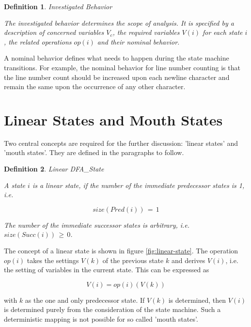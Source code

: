 \documentclass[12pt,a4paper]{scrartcl}
\newtheorem{definition}{Definition}
\begin{document}
\begin{definition} Investigated Behavior 

The investigated behavior determines the scope of analysis. It is
specified by a description of concerned variables $V_c$, the required
variables $V(i)$ for each state $i$, the related operations $op(i)$ and
their nominal behavior.
\end{definition}
    
A nominal behavior defines what needs to happen during the state machine
transitions.  For example, the nominal behavior for line number counting is
that the line number count should be increased upon each newline character
and remain the same upon the occurrence of any other character. 

%
\section{Linear States and Mouth States}

Two central concepts are required for the further discussion: 'linear states'
and 'mouth states'.  They are defined in the paragraphs to follow. 

\begin{definition}
Linear DFA_State

A state $i$ is a linear state, if the number of the immediate predecessor states is
1, i.e. 

\begin{equation}
                           size(Pred(i))\,=\,1
\end{equation}

The number of the immediate successor states is arbitrary, i.e.
$size(Succ(i))\,\ge\,0$.

\end{definition}

The concept of a linear state is shown in figure \eqref{fig:linear-state}. The
operation $op(i)$ takes the settings $V(k)$ of the previous state $k$
and derives $V(i)$, i.e.  the setting of variables in the current state. This
can be expressed as 

\begin{equation} \label{eq:accumulation}
            V(i) = op(i)(V(k))                                         
\end{equation}

with $k$ as the one and only predecessor state. If $V(k)$ is determined, then
$V(i)$ is determined purely from the consideration of the state machine. Such a
deterministic mapping is not possible for so called 'mouth states'.
\end{document}
